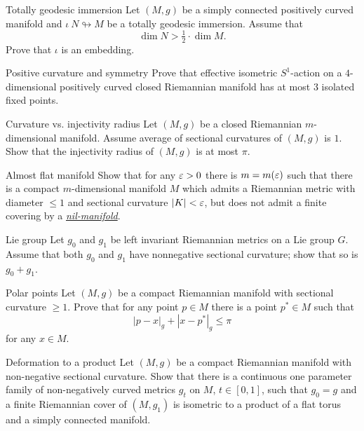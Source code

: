 \documentclass[twoside]{book}
\begin{document}
\begin{pr}{\hard}{Totally geodesic immersion}\label{Totally geodesic immersion}
Let $(M,g)$ be a simply connected positively curved manifold and $\iota\:N\looparrowright M$ be a totally geodesic immersion.
Assume that 
\[\dim N>\tfrac 12\cdot \dim M.\]
Prove that $\iota$ is an embedding.
\end{pr}


\begin{pr}{\thm}{Positive curvature and symmetry}\label{kleiner-hopf} 
Prove that effective isometric $S^1$-action 
on a $4$-dimensional positively curved closed Riemannian manifold  
has at most $3$ isolated fixed points.
\end{pr}

\begin{pr}{\thm}{Curvature vs. injectivity radius}\label{scalar-curv} 
Let $(M,g)$ be a closed 
Riemannian $m$-dimensional manifold.
Assume average of sectional curvatures of $(M,g)$ is $1$. 
Show that the injectivity radius of $(M,g)$ is at most $\pi$.
\end{pr}

\begin{pr}{}{Almost flat manifold}\label{almost-flat}
Show that for any $\varepsilon>0$ there is $m=m(\varepsilon)$ such that there is a compact
$m$-dimensional manifold $M$ which admits a Riemannian metric with diameter $\le 1$ and sectional
curvature $|K|<\varepsilon$,
but does not admit a finite covering by a \hyperref[Nil-manifolds]{\emph{nil-manifold}}.
\end{pr}

\begin{pr}{\easy}{Lie group}\label{lie-nonneg}
Let $g_0$ and $g_1$ be left invariant Riemannian metrics on a Lie group
$G$.
Assume that both $g_0$ and $g_1$ have nonnegative sectional curvature;
show that so is $g_0+g_1$.
\end{pr}

\begin{pr}{\many}{Polar points} \label{milka-polar} Let $(M,g)$ be a compact Riemannian manifold with sectional curvature $\ge 1$. 
Prove that for any point $p\in M$ there is a point $p^*\in M$ such that 
\[|p-x|_g+|x-p^*|_g\le \pi\]
for any $x\in M$.
\end{pr}

\begin{pr}{}{Deformation to a product}\label{Deformation to a product} 
Let $(M,g)$ be a compact Riemannian manifold with non-negative sectional curvature. 
Show that there is a continuous one parameter family of non-negatively curved metrics $g_t$ on $M$, $t\in[0,1]$, 
such that $g_0=g$ and a finite Riemannian cover of $(M,g_1)$ is isometric to a product of a flat torus and a simply connected manifold.
\end{pr}
\end{document}
